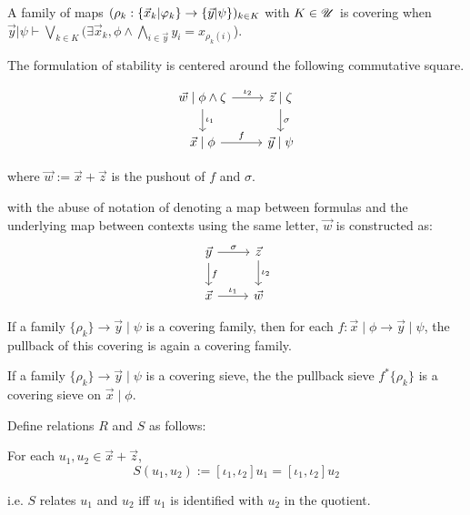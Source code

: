 \begin{definition}
  \leanok
  A family of maps $(\rho_k : \{ \vec{x}_k | \varphi_k \}\to \{ \vec{y} | \psi \})_{k \in K}$ with $K \in \mathscr{U}$ is covering when
  $\vec{y} | \psi \vdash \bigvee_{k \in K} (\exists \vec{x}_k, \phi \wedge \bigwedge_{i \in \vec{y}} y_i = x_{\rho_k(i)}$).
\end{definition}

The formulation of stability is centered around the following commutative square.

\[
\begin{tikzcd}
   \vec{w}\mid \phi\land \zeta \ar[r,"\iota_2"]\ar[d,"\iota_1"]  & \vec{z}\mid \zeta\ar[d,"\sigma"]\\
   \vec{x}\mid \phi \ar[r,"f"] & \vec{y}\mid \psi
\end{tikzcd}
\]

where $\vec{w}:= \vec{x}+ \vec{z}$ is the pushout of $f$ and $\sigma$.

with the abuse of notation of denoting a map between formulas and the underlying map between contexts using the same letter, $\vec{w}$ is constructed as:
\[
\begin{tikzcd}
 \vec{y}\ar[d,"f"]\ar[r,"\sigma"] & \vec{z}\ar[d,"\iota_2"]\\
 \vec{x}\ar[r,"\iota_1"] & \vec{w}
\end{tikzcd}
\]


\begin{lemma}
  If a family $\{\rho_k\}\to \vec{y}\mid \psi$ is a covering family, then for each $f: \vec{x}\mid \phi\to \vec{y}\mid\psi$, the pullback of this covering is again a covering family.
\end{lemma}

\begin{theorem}
  If a family $\{\rho_k\}\to \vec{y}\mid \psi$ is a covering sieve, the the pullback sieve $f^*\{\rho_k\}$ is a covering sieve on $\vec{x}\mid\phi$.

\end{theorem}



Define relations $R$ and $S$ as follows:

For each $u_1,u_2\in \vec{x}+\vec{z}$,
\[S(u_1,u_2):= [\iota_1,\iota_2]u_1 =  [\iota_1,\iota_2]u_2\]

i.e. $S$ relates $u_1$ and $u_2$ iff $u_1$ is identified with $u_2$ in the quotient.

